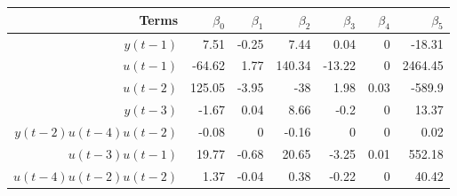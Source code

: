 \begin{tabular}{rrrrrrr}
Terms & $\beta_0$ & $\beta_1$ & $\beta_2$ & $\beta_3$ & $\beta_4$ & $\beta_5$ \\ 
\hline 
$y(t-1)$ & 7.51 & -0.25 & 7.44 & 0.04 & 0 & -18.31 \\ 
$u(t-1)$ & -64.62 & 1.77 & 140.34 & -13.22 & 0 & 2464.45 \\ 
$u(t-2)$ & 125.05 & -3.95 & -38 & 1.98 & 0.03 & -589.9 \\ 
$y(t-3)$ & -1.67 & 0.04 & 8.66 & -0.2 & 0 & 13.37 \\ 
$y(t-2)u(t-4)u(t-2)$ & -0.08 & 0 & -0.16 & 0 & 0 & 0.02 \\ 
$u(t-3)u(t-1)$ & 19.77 & -0.68 & 20.65 & -3.25 & 0.01 & 552.18 \\ 
$u(t-4)u(t-2)u(t-2)$ & 1.37 & -0.04 & 0.38 & -0.22 & 0 & 40.42 \\ 
\hline 
\end{tabular}